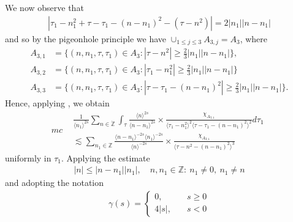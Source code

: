 \documentclass[12pt,reqno]{amsart}
\numberwithin{equation}{section}  %
\renewcommand{\cref}{\Cref}
\newcommand{\zz}{\mathbb{Z}}
\newcommand{\zzdot}{\dot{\zz}}
\begin{document}
We now observe that
%
%
\begin{equation*}
\begin{split}
  | \tau_{1} - n_{1}^{2} + \tau - \tau_{1} - (n - n_{1})^{2} - (\tau - n^{2}) | = 2| n_{1} || n - n_{1} |
\end{split}
\end{equation*}
%
%
and so by the pigeonhole principle we have $\cup_{1 \le j \le 3} A_{3,j} = A_{3}$, where 
\begin{align*}
  A_{3,1}&=\{(n, n_1, \tau, \tau_1)\in A_3: |\tau-n^{2}|\ge \frac{2}{3} |n_{1}|| n - n_{1} |\},\\
  A_{3,2}&=\{(n, n_1, \tau, \tau_1)\in A_3: |\tau_{1}-n_{1}^2|\ge \frac{2}{3} |n_{1}||n - n_{1}| \}\\
  A_{3,3}&=\{(n, n_1, \tau, \tau_1)\in A_3: |\tau - \tau_{1}-(n - n_{1})^2|\ge \frac{2}{3} |n_{1}||n - n_{1}| \}.
\end{align*} 
%
%
Hence, applying \cref{lem:calc}, we obtain
%
%
%
%
%
%
%
%
%
%
%
%
%
%
\begin{equation}
  mc\label{region-4-1}
\begin{split}
  &  \frac{1}{\langle n_{1} \rangle^{2s}} \sum_{n \in \zzdot} \int_{\tau} \frac{\langle n \rangle ^{2s}}{\langle n - n_{1}\rangle ^{2s}}  \times \frac{\chi_{A_{3,1}}}{\langle
      \tau_{1} - n_{1}^{2} \rangle^{2}  \langle \tau - \tau_{1} - (n - n_{1})^{2} \rangle^{2}} d \tau_{1}
  \\
  &  \lesssim \sum_{n_{1} \in \zz} \frac{\langle n - n_{1} \rangle ^{-2s} \langle n_{1} \rangle ^{-2s}}{\langle
    n\rangle ^{-2s}} 
    \times \frac{\chi_{A_{3,1}}}{\langle \tau - n^{2} - (n - n_{1})^{2} \rangle ^{3}}
  \end{split}
\end{equation}
%
%
uniformly in $\tau_{1}$. Applying the estimate
  \begin{equation}
    \label{integer-bound}
  \begin{split}
    | n | \le | n - n_{1} | | n_{1} |, \quad n, n_{1} \in \zz: \ n_{1} \neq 0, \ n_{1} \neq n
  \end{split}
  \end{equation}
  and adopting the notation
  \begin{equation*}
  \begin{split}
  \gamma(s) = 
  \begin{cases} 0, \quad & s \ge 0
    \\
    4|s|, \quad & s < 0
  \end{cases}
\end{split}
  \end{equation*}
\end{document}

